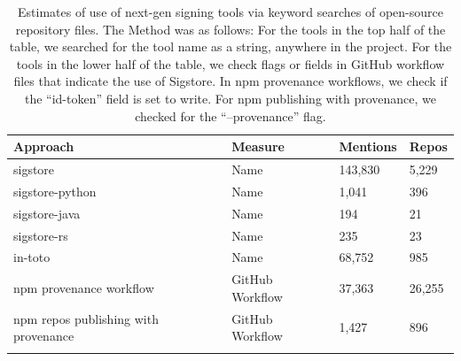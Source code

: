\documentclass{IEEEcsmagTechrxiv}
\begin{document}
 \begin{table}
 	\vspace*{4pt}
	\caption{Estimates of use of next-gen signing tools via keyword searches of open-source repository files.
  The Method was as follows:
    For the tools in the top half of the table, we searched for the tool name as a string, anywhere in the project.
    For the tools in the lower half of the table, we check flags or fields in GitHub workflow files that indicate the use of Sigstore.
    In npm provenance workflows, we check if the ``id-token'' field is set to write.
    For npm publishing with provenance, we checked for the ``--provenance'' flag.
	}
 	\label{table}
 	\tablefont
 	\begin{tabular*}{17.5pc}{@{}p{75pt}p{30pt}<{\raggedright}p{35pt}<{\raggedright}p{35pt}<{\raggedright}@{}}
 		\toprule
		\textbf{Approach}                        & \textbf{Measure} & \textbf{Mentions} & \textbf{Repos} \\
 		\midrule
		sigstore                             & Name               & 143,830           & 5,229          \\[3pt]
		sigstore-python                      & Name & 1,041             & 396            \\[3pt]
		sigstore-java                        & Name & 194               & 21             \\[3pt]
		sigstore-rs                          & Name & 235               & 23             \\[3pt]
  		in-toto                              & Name & 68,752            & 985            \\[3pt]
            \midrule
            npm provenance workflow              & GitHub Workflow              & 37,363            & 26,255         \\[3pt]
		npm repos publishing with provenance & GitHub Workflow & 1,427             & 896            \\[3pt]
 		\botrule
 	\end{tabular*}\vspace*{8pt}
	\label{table:next_gen_mentions}
 \end{table}
 
\end{document}
